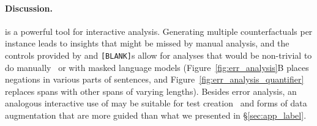\paragraph{Discussion.} 
\sysname{} is a powerful tool for interactive analysis.
Generating multiple counterfactuals per instance leads to insights that might be missed by manual analysis, and the controls provided by \tagstrs and \texttt{[BLANK]}s allow for analyses that would be non-trivial to do manually~\cite{wu2019errudite} or with masked language models (\eg Figure~\ref{fig:err_analysis}B places negations in various parts of sentences, and Figure~\ref{fig:err_analysis_quantifier} replaces spans with other spans of varying lengths). Besides error analysis, an analogous interactive use of \sysname{} may be suitable for test creation~\cite{checklist:acl20} and forms of data augmentation that are more guided than what we presented in \S\ref{sec:app_label}.
